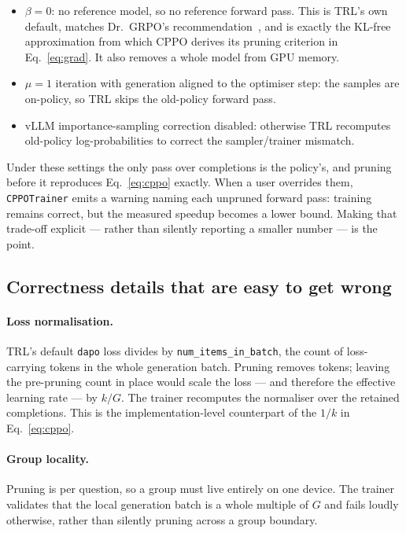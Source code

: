\documentclass[11pt,a4paper]{article}
\begin{document}
\begin{itemize}
  \item $\beta = 0$: no reference model, so no reference forward pass. This is
  TRL's own default, matches Dr.~GRPO's recommendation~\cite{liu2025drgrpo},
  and is exactly the KL-free approximation from which CPPO derives its pruning
  criterion in Eq.~\eqref{eq:grad}. It also removes a whole model from GPU
  memory.
  \item $\mu = 1$ iteration with generation aligned to the optimiser step: the
  samples are on-policy, so TRL skips the old-policy forward pass.
  \item vLLM importance-sampling correction disabled: otherwise TRL recomputes
  old-policy log-probabilities to correct the sampler/trainer mismatch.
\end{itemize}

Under these settings the only pass over completions is the policy's, and
pruning before it reproduces Eq.~\eqref{eq:cppo} exactly. When a user
overrides them, \texttt{CPPOTrainer} emits a warning naming each unpruned
forward pass: training remains correct, but the measured speedup becomes a
lower bound. Making that trade-off explicit --- rather than silently reporting
a smaller number --- is the point.

\subsection{Correctness details that are easy to get wrong}

\paragraph{Loss normalisation.} TRL's default \texttt{dapo} loss divides by
\texttt{num\_items\_in\_batch}, the count of loss-carrying tokens in the whole
generation batch. Pruning removes tokens; leaving the pre-pruning count in
place would scale the loss --- and therefore the effective learning rate --- by
$k/G$. The trainer recomputes the normaliser over the retained completions.
This is the implementation-level counterpart of the $1/k$ in
Eq.~\eqref{eq:cppo}.

\paragraph{Group locality.} Pruning is per question, so a group must live
entirely on one device. The trainer validates that the local generation batch
is a whole multiple of $G$ and fails loudly otherwise, rather than silently
pruning across a group boundary.
\end{document}
